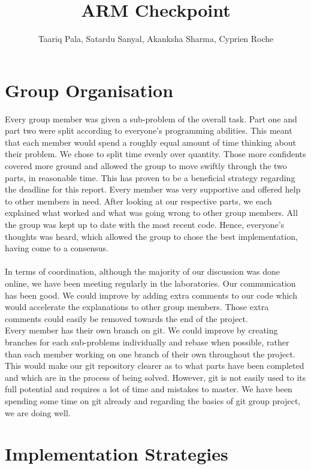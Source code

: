 \documentclass[11pt]{article}
\begin{document}
\title{ARM Checkpoint}
\author{Taariq Pala, Satardu Sanyal, Akanksha Sharma, Cyprien Roche}

\maketitle

\section{Group Organisation}

Every group member was given a sub-problem of the overall task. Part one and part two were split according to everyone's programming abilities. This meant that each member would spend a roughly equal amount of time thinking about their problem. We chose to split time evenly over quantity. Those more confidents covered more ground and allowed the group to move swiftly through the two parts, in reasonable time. This has proven to be a beneficial strategy regarding the deadline for this report. Every member was very supportive and offered help to other members in need. After looking at our respective parts, we each explained what worked and what was going wrong to other group members. All the group was kept up to date with the most recent code. Hence, everyone's thoughts was heard, which allowed the group to chose the best implementation, having come to a consensus.
\\
\\
In terms of coordination, although the majority of our discussion was done online, we have been meeting regularly in the laboratories. Our communication has been good. We could improve by adding extra comments to our code which would accelerate the explanations to other group members. Those extra comments could easily be removed towards the end of the project.
\\
Every member has their own branch on git. We could improve by creating branches for each sub-problems individually and rebase when possible, rather than each member working on one branch of their own throughout the project. This would make our git repository clearer as to what parts have been completed and which are in the process of being solved. However, git is not easily used to its full potential and requires a lot of time and mistakes to master. We have been spending some time on git already and regarding the basics of git group project, we are doing well. 



\section{Implementation Strategies}




\end{document}
